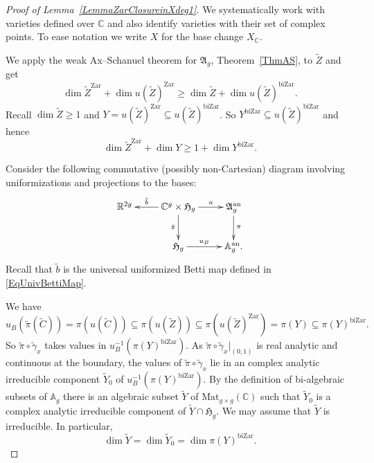 \documentclass[12pt,oneside]{amsart}
\numberwithin{maincounter}{section}
\numberwithin{equation}{section}
\def\AA{\mathbb{A}}
\def\RR{\mathbb{R}}
\def\CC{\mathbb{C}}
\newcommand{\IC}{{\CC}}
\newcommand{\IR}{{\RR}}
\newcommand{\IA}{{\AA}}
\renewcommand{\subset}{\subseteq} %
\begin{document}
\begin{proof}[Proof of Lemma~\ref{LemmaZarClosureinXdeg1}]
  We systematically work with varieties defined over $\IC$ and  also identify
  varieties with their set of complex points.
  To ease notation we write $X$ for the base change $X_\IC$.


  We apply the weak Ax--Schanuel theorem for $\mathfrak{A}_g$,
  Theorem~\ref{ThmAS}, to $\tilde Z$ and get
  \begin{equation*}
    \dim {\tilde Z}^{\mathrm{Zar}} + \dim u(\tilde Z)^{\mathrm{Zar}} \ge \dim \tilde Z + \dim u(\tilde Z)^{\mathrm{biZar}}.
  \end{equation*}
  Recall $\dim \tilde Z\ge 1$ and  $Y=u(\tilde
  Z)^{\mathrm{Zar}}\subset u(\tilde Z)^{\mathrm{biZar}}$. So
  $Y^{\mathrm{biZar}}\subset  u(\tilde Z)^{\mathrm{biZar}}$
  and hence
  \begin{equation}
    \label{eq:masineq}
    \dim {\tilde Z}^{\mathrm{Zar}} + \dim Y \ge 1 + \dim Y^{\mathrm{biZar}}.
  \end{equation}  

  Consider the following commutative (possibly non-Cartesian) diagram involving uniformizations and projections to the bases:
  \begin{equation*}%
    \xymatrix{
      \IR^{2g} & \IC^g \times \mathfrak{H}_g \ar[l]_-{\tilde{b}} \ar[r]^-{u} \ar[d]_{\tilde{\pi}} & \mathfrak{A}_g^{\mathrm{an}} \ar[d]^{\pi} \\
      & \mathfrak{H}_g \ar[r]^-{u_B} & \mathbb{A}_g^{\mathrm{an}}.
    }
  \end{equation*}
  Recall that  $\tilde b$
  is the universal uniformized Betti map defined in
  \eqref{EqUnivBettiMap}.

  We have
  \begin{equation*}
    u_B(\tilde \pi(\tilde C)) = \pi(u(\tilde C)) \subset
    \pi(u(\tilde Z)) \subset \pi(u(\tilde Z)^{\mathrm{Zar}})=\pi(Y) \subset \pi(Y)^{\mathrm{biZar}}.
  \end{equation*}
  So $\tilde\pi\circ\tilde \gamma_x$ takes values in
  $u_B^{-1}(\pi(Y)^{\mathrm{biZar}})$. As
  $\tilde\pi\circ\tilde\gamma_x|_{(0,1)}$ is real analytic and
  continuous at the boundary, the values
  of $\tilde\pi\circ\tilde \gamma_x$ lie in an complex analytic
  irreducible component $\tilde Y_0$ of   $u_B^{-1}(\pi(Y)^{\mathrm{biZar}})$. By
  the definition of bi-algebraic subsets of $\IA_g$ there is an
  algebraic subset $\tilde Y$ of $\mathrm{Mat}_{g\times g}(\IC)$ such that
  $\tilde Y_0$ is a complex analytic irreducible component of
  $\tilde Y \cap \mathfrak{H}_g$.  We may assume that $\tilde Y$ is
  irreducible.
  In particular,
  \begin{equation}
    \label{eq:dimYequality}
   \dim \tilde Y = \dim \tilde Y_0 =
  \dim \pi(Y)^{\mathrm{biZar}}. 
  \end{equation}


\end{proof}
\end{document}
